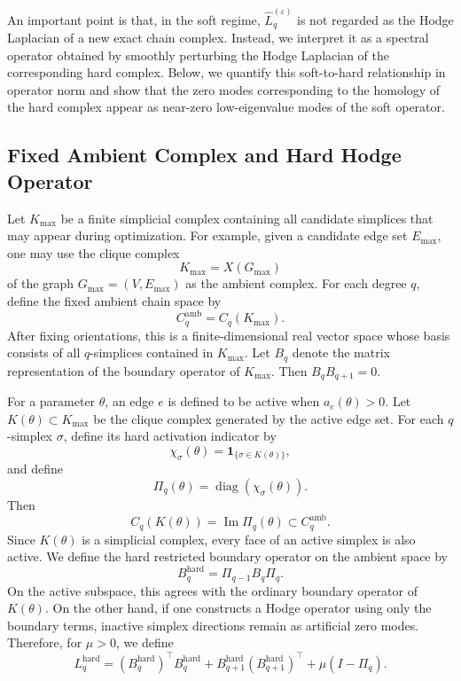 \documentclass[pdflatex,sn-mathphys-num]{sn-jnl}%
\theoremstyle{thmstyleone}%
\theoremstyle{thmstyletwo}%
\theoremstyle{thmstylethree}%
\begin{document}
An important point is that, in the soft regime, \(\widehat L_q^{(\varepsilon)}\) is not regarded as the Hodge Laplacian of a new exact chain complex. Instead, we interpret it as a spectral operator obtained by smoothly perturbing the Hodge Laplacian of the corresponding hard complex.
Below, we quantify this soft-to-hard relationship in operator norm and show that the zero modes corresponding to the homology of the hard complex appear as near-zero low-eigenvalue modes of the soft operator.


\subsection{Fixed Ambient Complex and Hard Hodge Operator}

Let \(K_{\max}\) be a finite simplicial complex containing all candidate simplices that may appear during optimization. For example, given a candidate edge set \(E_{\max}\), one may use the clique complex
\[
K_{\max}=X(G_{\max})
\]
of the graph $G_{\max}=(V,E_{\max})$ as the ambient complex.
For each degree \(q\), define the fixed ambient chain space by
\[
C_q^{\mathrm{amb}}
=
C_q(K_{\max}).
\]
After fixing orientations, this is a finite-dimensional real vector space whose basis consists of all \(q\)-simplices contained in \(K_{\max}\).
Let \(B_q\) denote the matrix representation of the boundary operator of \(K_{\max}\). Then $B_qB_{q+1}=0$.

For a parameter \(\theta\), an edge \(e\) is defined to be active when $a_e(\theta)>0$.
Let $K(\theta)\subset K_{\max}$
be the clique complex generated by the active edge set.
For each \(q\)-simplex \(\sigma\), define its hard activation indicator by
\[
\chi_\sigma(\theta)
=
\mathbf 1_{\{\sigma\in K(\theta)\}},
\]
and define
\[
\Pi_q(\theta)
=
\operatorname{diag}
\left(
\chi_\sigma(\theta)
\right).
\]
Then
\[
C_q(K(\theta))
=
\operatorname{Im}\Pi_q(\theta)
\subset
C_q^{\mathrm{amb}}.
\]
Since \(K(\theta)\) is a simplicial complex, every face of an active simplex is also active.
We define the hard restricted boundary operator on the ambient space by
\[
B_q^{\mathrm{hard}}
=
\Pi_{q-1}B_q\Pi_q.
\]
On the active subspace, this agrees with the ordinary boundary operator of \(K(\theta)\).
On the other hand, if one constructs a Hodge operator using only the boundary terms, inactive simplex directions remain as artificial zero modes. Therefore, for \(\mu>0\), we define
\[
L_q^{\mathrm{hard}}
=
(B_q^{\mathrm{hard}})^\top B_q^{\mathrm{hard}}
+
B_{q+1}^{\mathrm{hard}}
(B_{q+1}^{\mathrm{hard}})^\top
+
\mu(I-\Pi_q).
\]
\end{document}
